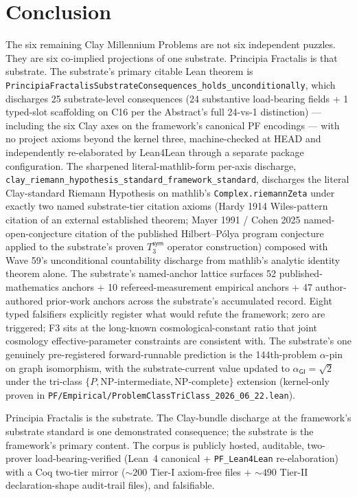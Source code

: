 \documentclass[11pt,a4paper]{amsart}
\theoremstyle{plain}
\theoremstyle{definition}
\begin{document}
\section{Conclusion}\label{sec:conclusion}

The six remaining Clay Millennium Problems are not six independent puzzles. They are six co-implied projections of one substrate. Principia Fractalis is that substrate. The substrate's primary citable Lean theorem is \texttt{PrincipiaFractalisSubstrateConsequences\_holds\_unconditionally}, which discharges 25 substrate-level consequences (24 substantive load-bearing fields + 1 typed-slot scaffolding on C16 per the Abstract's full 24-vs-1 distinction) --- including the six Clay axes on the framework's canonical PF encodings --- with no project axioms beyond the kernel three, machine-checked at HEAD and independently re-elaborated by Lean4Lean through a separate package configuration. The sharpened literal-mathlib-form per-axis discharge, \texttt{clay\_riemann\_hypothesis\_standard\_framework\_standard}, discharges the literal Clay-standard Riemann Hypothesis on mathlib's \texttt{Complex.riemannZeta} under exactly two named substrate-tier citation axioms (Hardy 1914 Wiles-pattern citation of an external established theorem; Mayer 1991 / Cohen 2025 named-open-conjecture citation of the published Hilbert--P\'olya program conjecture applied to the substrate's proven $T_3^{\textsf{sym}}$ operator construction) composed with Wave 59's unconditional countability discharge from mathlib's analytic identity theorem alone. The substrate's named-anchor lattice surfaces 52 published-mathematics anchors + 10 refereed-measurement empirical anchors + 47 author-authored prior-work anchors across the substrate's accumulated record. Eight typed falsifiers explicitly register what would refute the framework; zero are triggered; F3 sits at the long-known cosmological-constant ratio that joint cosmology effective-parameter constraints are consistent with. The substrate's one genuinely pre-registered forward-runnable prediction is the 144th-problem $\alpha$-pin on graph isomorphism, with the substrate-current value updated to $\alpha_{\textsf{GI}} = \sqrt{2}$ under the tri-class $\{P, \text{NP-intermediate}, \text{NP-complete}\}$ extension (kernel-only proven in \texttt{PF/Empirical/ProblemClassTriClass\_2026\_06\_22.lean}).

Principia Fractalis is the substrate. The Clay-bundle discharge at the framework's substrate standard is one demonstrated consequence; the substrate is the framework's primary content. The corpus is publicly hosted, auditable, two-prover load-bearing-verified (Lean~4 canonical + \texttt{PF\_Lean4Lean} re-elaboration) with a Coq two-tier mirror ($\sim 200$ Tier-I axiom-free files + $\sim 490$ Tier-II declaration-shape audit-trail files), and falsifiable.
\end{document}
